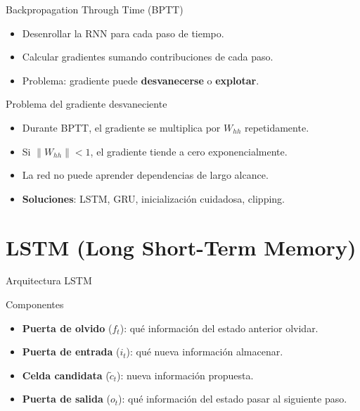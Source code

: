 \documentclass[aspectratio=169, 10pt, xcolor=table]{beamer}
\begin{document}
\begin{frame}{Backpropagation Through Time (BPTT)}
    \begin{itemize}
        \item Desenrollar la RNN para cada paso de tiempo.
        \item Calcular gradientes sumando contribuciones de cada paso.
        \item Problema: gradiente puede \textbf{desvanecerse} o \textbf{explotar}.
    \end{itemize}
\end{frame}

\begin{frame}{Problema del gradiente desvaneciente}
    \begin{itemize}
        \item Durante BPTT, el gradiente se multiplica por $W_{hh}$ repetidamente.
        \item Si $\|W_{hh}\| < 1$, el gradiente tiende a cero exponencialmente.
        \item La red no puede aprender dependencias de largo alcance.
        \item \textbf{Soluciones}: LSTM, GRU, inicialización cuidadosa, clipping.
    \end{itemize}
\end{frame}

\section{LSTM (Long Short-Term Memory)}

\begin{frame}{Arquitectura LSTM}
    \begin{block}{Componentes}
        \begin{itemize}
            \item \textbf{Puerta de olvido} ($f_t$): qué información del estado anterior olvidar.
            \item \textbf{Puerta de entrada} ($i_t$): qué nueva información almacenar.
            \item \textbf{Celda candidata} ($\tilde{c}_t$): nueva información propuesta.
            \item \textbf{Puerta de salida} ($o_t$): qué información del estado pasar al siguiente paso.
        \end{itemize}
    \end{block}
\end{frame}
\end{document}
